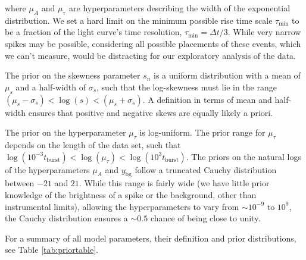 \documentclass[12pt]{emulateapj}
\newcommand{\counts}{y}
\begin{document}
where $\mu_A$ and $\mu_{\mathrm{\tau}}$ are hyperparameters describing the width of the exponential distribution.
We set a hard limit on the minimum possible rise time scale
$\tau_{\mathrm{min}}$ to be a fraction of the light curve's time
resolution, $\tau_{\mathrm{min}} = \Delta t/3$. While very narrow spikes
may be possible, considering all possible placements of these events,
which we can't measure, would be distracting for our exploratory
analysis of the data.

The prior on the skewness parameter $s_n$ is a uniform distribution with a mean of $\mu_s$ and a half-width of $\sigma_s$, such
that the log-skewness must lie in the range $(\mu_s-\sigma_s) < \log{(s)} < (\mu_s+\sigma_s)$. A definition in terms of mean and half-width ensures
that positive and negative skews are equally likely a priori. 

The prior on the hyperparameter $\mu_{\tau}$ is log-uniform. The prior range for
$\mu_{\tau}$ depends on the length of the data set, such that $\log{(10^{-3}t_{\mathrm{burst}})} < \log{(\mu_{\tau})} < \log{(10^{3}t_\mathrm{burst})}$.
The priors on the natural logs of the hyperparameters $\mu_A$ and $\counts_{\mathrm{bg}}$ follow a truncated Cauchy distribution between $-21$ and $21$. While
this range is fairly wide (we have little prior knowledge of the brightness of a spike or the background, other than instrumental limits), 
allowing the hyperparameters to vary from $\sim 10^{-9}$ to $10^{9}$, the Cauchy distribution ensures a $\sim 0.5$ chance of being close to unity.

For a summary of all model parameters, their definition and prior distributions, see Table \ref{tab:priortable}.
\end{document}
